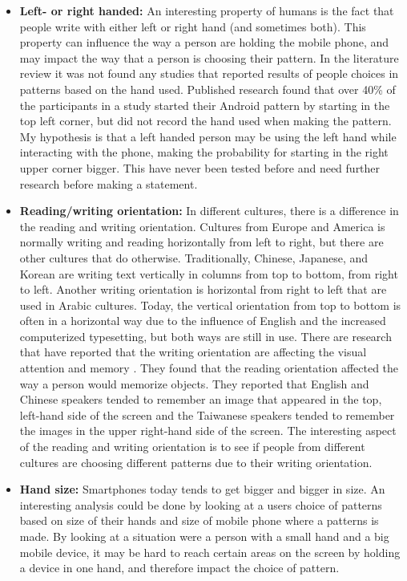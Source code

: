 \begin{itemize}
    \item {\bf Left- or right handed:} An interesting property of humans is the fact that people write with either left or right hand (and sometimes both). This property can influence the way a person are holding the mobile phone, and may impact the way that a person is choosing their pattern. In the literature review it was not found any studies that reported results of people choices in patterns based on the hand used. Published research \cite{Uellenbeck} found that over 40\% of the participants in a study started their Android pattern by starting in the top left corner, but did not record the hand used when making the pattern. My hypothesis is that a left handed person may be using the left hand while interacting with the phone, making the probability for starting in the right upper corner bigger. This have never been tested before and need further research before making a statement. 
    \item {\bf Reading/writing orientation:} In different cultures, there is a difference in the reading and writing orientation. Cultures from Europe and America is normally writing and reading horizontally from left to right, but there are other cultures that do otherwise. Traditionally, Chinese, Japanese, and Korean are writing text vertically in columns from top to bottom, from right to left. Another writing orientation is horizontal from right to left that are used in Arabic cultures. Today, the vertical orientation from top to bottom is often in a horizontal way due to the influence of English and the increased computerized typesetting, but both ways are still in use. There are research that have reported that the writing orientation are affecting the visual attention and memory \cite{Chan}. They found that the reading orientation affected the way a person would memorize objects. They reported that English and Chinese speakers tended to remember an image that appeared in the top, left-hand side of the screen and the Taiwanese speakers tended to remember the images in the upper right-hand side of the screen. The interesting aspect of the reading and writing orientation is to see if people from different cultures are choosing different patterns due to their writing orientation.
    \item {\bf Hand size:} Smartphones today tends to get bigger and bigger in size. An interesting analysis could be done by looking at a users choice of patterns based on size of their hands and size of mobile phone where a patterns is made. By looking at a situation were a person with a small hand and a big mobile device, it may be hard to reach certain areas on the screen by holding a device in one hand, and therefore impact the choice of pattern. 
  \end{itemize}

